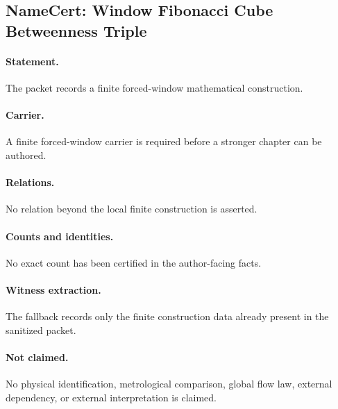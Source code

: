 \subsection{NameCert: Window Fibonacci Cube Betweenness Triple}
\label{sec:namecert-window_fibonacci_cube_betweenness_triple_certificate}

\paragraph{Statement.} The packet records a finite forced-window mathematical construction.

\paragraph{Carrier.} A finite forced-window carrier is required before a stronger chapter can be authored.

\paragraph{Relations.} No relation beyond the local finite construction is asserted.

\paragraph{Counts and identities.} No exact count has been certified in the author-facing facts.

\paragraph{Witness extraction.} The fallback records only the finite construction data already present in the sanitized packet.

\paragraph{Not claimed.} No physical identification, metrological comparison, global flow law, external dependency, or external interpretation is claimed.
